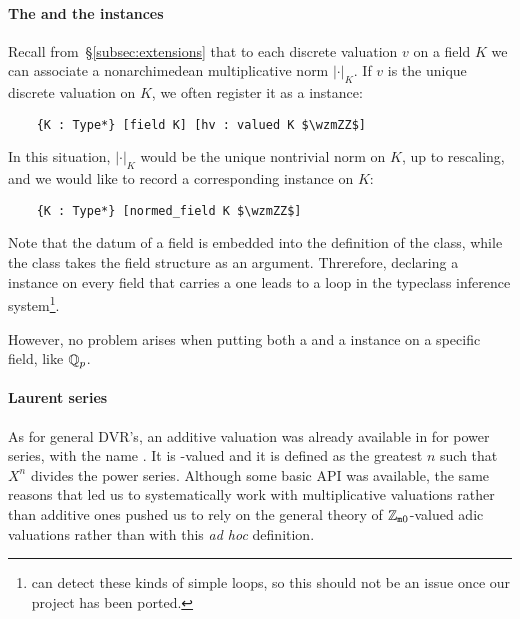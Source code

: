 \documentclass[sigplan,10pt,anonymous,review]{acmart}
\begin{document}
\paragraph{The  and the  instances}
Recall from~\S\ref{subsec:extensions} that to each discrete valuation $v$ on a field $K$ we can associate a nonarchimedean multiplicative norm $\lvert\cdot\rvert_K$. If $v$ is the unique discrete valuation on $K$, we often register it as a  instance:
\begin{lstlisting}
    {K : Type*} [field K] [hv : valued K $\wzmZZ$] 
\end{lstlisting}
In this situation, $\lvert\cdot\rvert_K$ would be the unique nontrivial norm on $K$, up to rescaling, and we would like to record a corresponding  instance on $K$:
\begin{lstlisting}
    {K : Type*} [normed_field K $\wzmZZ$] 
\end{lstlisting}
Note that the datum of a field is embedded into the definition of the  class, while the class  takes the field structure as an argument. Threrefore, declaring a  instance on every field that carries a  one leads to a loop in the typeclass inference system\footnote{\lean[4] can detect these kinds of simple loops, so this should not be an issue once our project has been ported.}.

However, no problem arises when putting both a  and a  instance on a specific field, like $\mathbb{Q}_p$.


\paragraph{Laurent series}
As for general DVR's, an additive valuation was already available in \mathlib for power series, with the name \href{https://leanprover-community.github.io/mathlib_docs/ring_theory/hahn_series.html#hahn_series.add_val}{\extlink}. It is -valued and it is defined as the greatest $n$ such that $X^n$ divides the power series. Although some basic API was available, the same reasons that led us to systematically work with multiplicative valuations rather than additive ones pushed us to rely on the general theory of $\mathbb{Z}_{\mathtt{m}0}$-valued adic valuations rather than with this \emph{ad hoc} definition.
\end{document}
